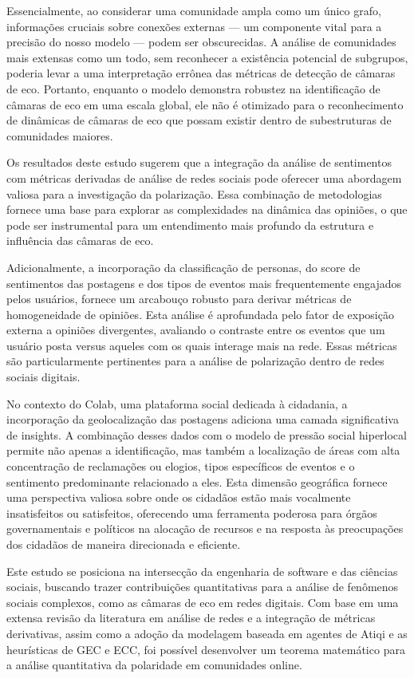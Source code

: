 Essencialmente, ao considerar uma comunidade ampla como um único grafo, informações cruciais sobre conexões externas — um componente vital para a precisão do nosso modelo — podem ser obscurecidas. A análise de comunidades mais extensas como um todo, sem reconhecer a existência potencial de subgrupos, poderia levar a uma interpretação errônea das métricas de detecção de câmaras de eco. Portanto, enquanto o modelo demonstra robustez na identificação de câmaras de eco em uma escala global, ele não é otimizado para o reconhecimento de dinâmicas de câmaras de eco que possam existir dentro de subestruturas de comunidades maiores.

Os resultados deste estudo sugerem que a integração da análise de sentimentos com métricas derivadas de análise de redes sociais pode oferecer uma abordagem valiosa para a investigação da polarização. Essa combinação de metodologias fornece uma base para explorar as complexidades na dinâmica das opiniões, o que pode ser instrumental para um entendimento mais profundo da estrutura e influência das câmaras de eco.

Adicionalmente, a incorporação da classificação de personas, do score de sentimentos das postagens e dos tipos de eventos mais frequentemente engajados pelos usuários, fornece um arcabouço robusto para derivar métricas de homogeneidade de opiniões. Esta análise é aprofundada pelo fator de exposição externa a opiniões divergentes, avaliando o contraste entre os eventos que um usuário posta versus aqueles com os quais interage mais na rede. Essas métricas são particularmente pertinentes para a análise de polarização dentro de redes sociais digitais.

No contexto do Colab, uma plataforma social dedicada à cidadania, a incorporação da geolocalização das postagens adiciona uma camada significativa de insights. A combinação desses dados com o modelo de pressão social hiperlocal permite não apenas a identificação, mas também a localização de áreas com alta concentração de reclamações ou elogios, tipos específicos de eventos e o sentimento predominante relacionado a eles. Esta dimensão geográfica fornece uma perspectiva valiosa sobre onde os cidadãos estão mais vocalmente insatisfeitos ou satisfeitos, oferecendo uma ferramenta poderosa para órgãos governamentais e políticos na alocação de recursos e na resposta às preocupações dos cidadãos de maneira direcionada e eficiente.

Este estudo se posiciona na intersecção da engenharia de software e das ciências sociais, buscando trazer contribuições quantitativas para a análise de fenômenos sociais complexos, como as câmaras de eco em redes digitais. Com base em uma extensa revisão da literatura em análise de redes e a integração de métricas derivativas, assim como a adoção da modelagem baseada em agentes de Atiqi e as heurísticas de GEC e ECC, foi possível desenvolver um teorema matemático para a análise quantitativa da polaridade em comunidades online.

